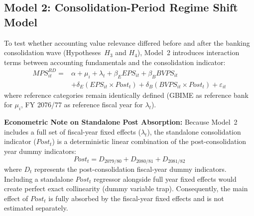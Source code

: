 \subsection{Model 2: Consolidation-Period Regime Shift Model}
To test whether accounting value relevance differed before and after the banking consolidation wave (Hypotheses~$H_3$ and $H_4$), Model~2 introduces interaction terms between accounting fundamentals and the consolidation indicator:
\begin{equation}
\begin{aligned}
\mathit{MPS}^{RD}_{it} ={}& \alpha + \mu_i + \lambda_t + \beta_E \mathit{EPS}_{it} + \beta_B \mathit{BVPS}_{it} \\
& + \delta_E (\mathit{EPS}_{it} \times \mathit{Post}_t) + \delta_B (\mathit{BVPS}_{it} \times \mathit{Post}_t) + \varepsilon_{it}
\end{aligned}
\label{eq:fe_model2}
\end{equation}
where reference categories remain identically defined (GBIME as reference bank for $\mu_i$, FY 2076/77 as reference fiscal year for $\lambda_t$).

\textbf{Econometric Note on Standalone Post Absorption:}
Because Model~2 includes a full set of fiscal-year fixed effects ($\lambda_t$), the standalone consolidation indicator ($\mathit{Post}_t$) is a deterministic linear combination of the post-consolidation year dummy indicators:
\begin{equation}
\mathit{Post}_t = D_{2079/80} + D_{2080/81} + D_{2081/82}
\end{equation}
where $D_t$ represents the post-consolidation fiscal-year dummy indicators. Including a standalone $\mathit{Post}_t$ regressor alongside full year fixed effects would create perfect exact collinearity (dummy variable trap). Consequently, the main effect of $\mathit{Post}_t$ is fully absorbed by the fiscal-year fixed effects and is not estimated separately.

